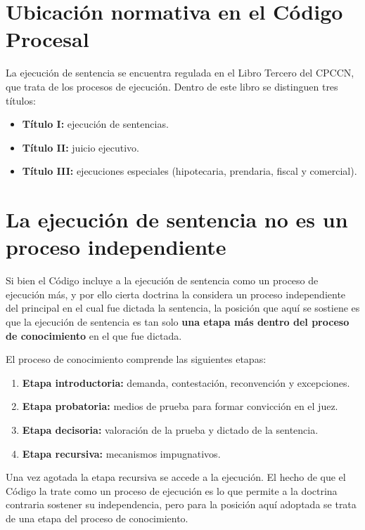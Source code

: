 \documentclass[12pt,oneside]{book}
\begin{document}
\section{Ubicación normativa en el Código Procesal}

La ejecución de sentencia se encuentra regulada en el Libro Tercero del CPCCN, que trata de los procesos de ejecución. Dentro de este libro se distinguen tres títulos:

\begin{itemize}
    \item \textbf{Título I:} ejecución de sentencias.
    \item \textbf{Título II:} juicio ejecutivo.
    \item \textbf{Título III:} ejecuciones especiales (hipotecaria, prendaria, fiscal y comercial).
\end{itemize}

\section{La ejecución de sentencia no es un proceso independiente}

Si bien el Código incluye a la ejecución de sentencia como un proceso de ejecución más, y por ello cierta doctrina la considera un proceso independiente del principal en el cual fue dictada la sentencia, la posición que aquí se sostiene es que la ejecución de sentencia es tan solo \textbf{una etapa más dentro del proceso de conocimiento} en el que fue dictada.

El proceso de conocimiento comprende las siguientes etapas:

\begin{enumerate}
    \item \textbf{Etapa introductoria:} demanda, contestación, reconvención y excepciones.
    \item \textbf{Etapa probatoria:} medios de prueba para formar convicción en el juez.
    \item \textbf{Etapa decisoria:} valoración de la prueba y dictado de la sentencia.
    \item \textbf{Etapa recursiva:} mecanismos impugnativos.
\end{enumerate}

Una vez agotada la etapa recursiva se accede a la ejecución. El hecho de que el Código la trate como un proceso de ejecución es lo que permite a la doctrina contraria sostener su independencia, pero para la posición aquí adoptada se trata de una etapa del proceso de conocimiento.
\end{document}
